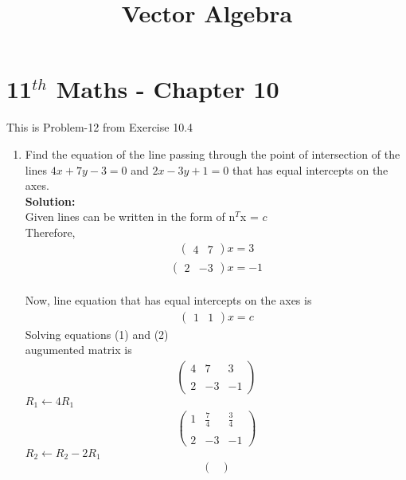 \documentclass[12pt]{article}
\newcommand{\solution}{\noindent \textbf{Solution: }}
\newcommand{\myvec}[1]{\ensuremath{\begin{pmatrix}#1\end{pmatrix}}}
\begin{document}
\begin{center}
\title{\textbf{Vector Algebra}}
\date{\vspace{-5ex}} %
\maketitle
\end{center}
\setcounter{page}{1}
\section*{11$^{th}$ Maths - Chapter 10}
This is Problem-12 from Exercise 10.4
\begin{enumerate}
    \item Find the equation of the line passing through the point of intersection of the lines $4x + 7y - 3 = 0$ and $2x - 3y + 1 = 0$ that has equal intercepts on the axes.\\
    \solution \\
    Given lines can be written in the form of n$^{T}$x = $c$
   \\Therefore,\\ \begin{align}
       \myvec{4&7}x=3
   \end{align} 
   \begin{align}
       \myvec{2&-3}x=-1
   \end{align}\\
   Now, line equation that has equal intercepts on the axes is
   \begin{align}
       \myvec{1 & 1}x=c
   \end{align}
   Solving equations (1) and (2)\\augumented matrix is
  \begin{align}
\begin{pmatrix}
    4 & 7 & 3 \\ \\
    2 & -3 & -1
  \end{pmatrix}
\end{align}
$R_1 \leftarrow 4 R_1$
\begin{align}
\begin{pmatrix}
    1 & \frac{7}{4} & \frac{3}{4} \\ \\
    2 & -3 & -1
  \end{pmatrix}
\end{align}
$R_2 \leftarrow R_2 - 2R_1$
\begin{align}
\begin{pmatrix}

\end{pmatrix}
\end{align}
\end{enumerate}
\end{document}
